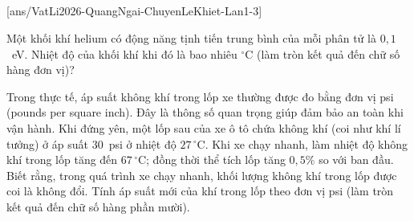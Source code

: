 	\subsection*{}
	\setcounter{ex}{0}
	[ans/VatLi2026-QuangNgai-ChuyenLeKhiet-Lan1-3]

	\begin{ex}%
		Một khối khí helium có động năng tịnh tiến trung bình của mỗi phân tử là $0{,}1$~eV. Nhiệt độ của khối khí khi đó là bao nhiêu $^\circ$C (làm tròn kết quả đến chữ số hàng đơn vị)?
		\par
	\end{ex}

	\begin{ex}%
		Trong thực tế, áp suất không khí trong lốp xe thường được đo bằng đơn vị psi (pounds per square inch). Đây là thông số quan trọng giúp đảm bảo an toàn khi vận hành. Khi đứng yên, một lốp sau của xe ô tô chứa không khí (coi như khí lí tưởng) ở áp suất $30$~psi ở nhiệt độ $27\,^\circ\text{C}$. Khi xe chạy nhanh, làm nhiệt độ không khí trong lốp tăng đến $67\,^\circ\text{C}$; đồng thời thể tích lốp tăng $0{,}5\%$ so với ban đầu. Biết rằng, trong quá trình xe chạy nhanh, khối lượng không khí trong lốp được coi là không đổi. Tính áp suất mới của khí trong lốp theo đơn vị psi (làm tròn kết quả đến chữ số hàng phần mười).
		\par
	\end{ex}

